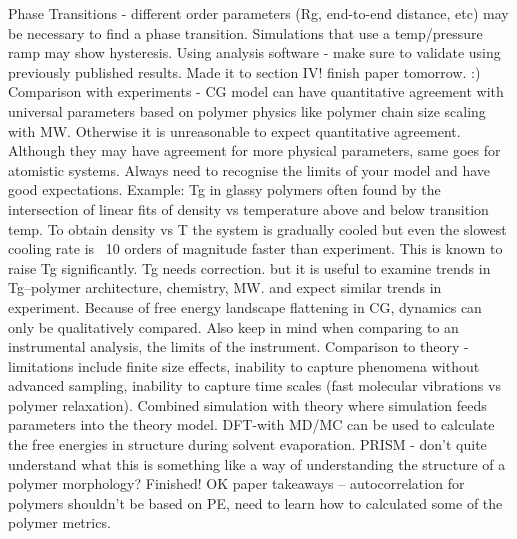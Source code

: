 \documentclass{article}
\begin{document}
Phase Transitions - different order parameters (Rg, end-to-end distance, etc) may be necessary to find a phase transition. Simulations that use a temp/pressure ramp may show hysteresis. 
Using analysis software - make sure to validate using previously published results.
Made it to section IV! finish paper tomorrow. :)
Comparison with experiments - CG model can have quantitative agreement with universal parameters based on polymer physics like polymer chain size scaling with MW. Otherwise it is unreasonable to expect quantitative agreement. Although they may have agreement for more physical parameters, same goes for atomistic systems. Always need to recognise the limits of your model and have good expectations. Example: Tg in glassy polymers often found by the intersection of linear fits of density vs temperature above and below transition temp. To obtain density vs T the system is gradually cooled but even the slowest cooling rate is ~10 orders of magnitude faster than experiment. This is known to raise Tg significantly. Tg needs correction. but it is useful to examine trends in Tg--polymer architecture, chemistry, MW. and expect similar trends in experiment. 
Because of free energy landscape flattening in CG, dynamics can only be qualitatively compared. Also keep in mind when comparing to an instrumental analysis, the limits of the instrument.
Comparison to theory - limitations include finite size effects, inability to capture phenomena without advanced sampling, inability to capture time scales (fast molecular vibrations vs polymer relaxation). Combined simulation with theory where simulation feeds parameters into the theory model.
DFT-with MD/MC can be used to calculate the free energies in structure during solvent evaporation.
PRISM - don't quite understand what this is something like a way of understanding the structure of a polymer morphology?
Finished! OK paper takeaways -- autocorrelation for polymers shouldn't be based on PE, need to learn how to calculated some of the polymer metrics.

\cite{Muller-Plathe2002}
\end{document}
